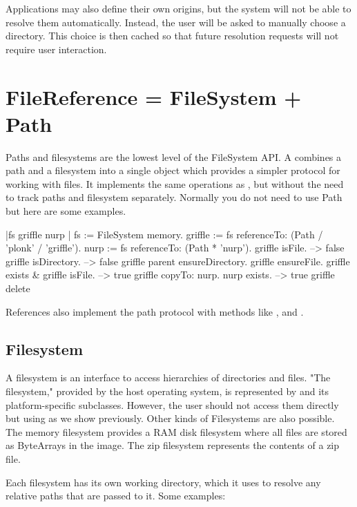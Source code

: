 \documentclass[a4paper,10pt,twoside]{book}
\begin{document}
Applications may also define their own origins, but the system will not be able to resolve them automatically. Instead, the user will be asked to manually choose a directory. This choice is then cached so that future resolution requests will not require user interaction.





\section{FileReference = FileSystem + Path}
Paths and filesystems are the lowest level of the FileSystem API. A  combines a path and a filesystem into a single object which provides a simpler protocol for working with files. It implements the same operations as , but without the need to track paths and filesystem separately.
Normally you do not need to use Path but here are some examples.

\begin{code}{}
|fs griffle nurp | 
fs := FileSystem memory.
griffle := fs referenceTo: (Path / 'plonk' / 'griffle').
nurp := fs referenceTo: (Path * 'nurp').
griffle isFile.	
    --> false			
griffle isDirectory. 		
    --> false		
griffle parent ensureDirectory.
griffle ensureFile.
griffle exists & griffle isFile.		
    --> true
griffle copyTo: nurp.
nurp exists.			
    --> true	
griffle delete       
\end{code}    

References also implement the path protocol with methods like \ct{/},  and .


\subsection{Filesystem}

A filesystem is an interface to access hierarchies of directories and files. "The filesystem," provided by the host operating system, is represented by  and its platform-specific subclasses. However, the user should not access them directly but using  as we show previously. Other kinds of Filesystems are also possible. The memory filesystem provides a RAM disk filesystem where all files are stored as ByteArrays in the image. The zip filesystem represents the contents of a zip file.

Each filesystem has its own working directory, which it uses to resolve any relative paths that are passed to it. Some examples:
\end{document}
